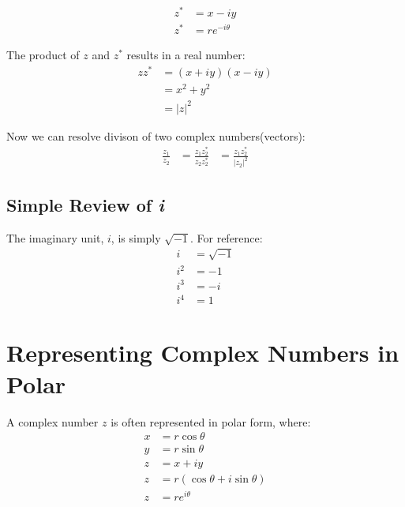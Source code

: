 \documentclass[12pt]{article}
\begin{document}
\begin{equation}
    \begin{aligned}
	    z^* &= x-iy\\
	    z^* &= re^{-i \theta}
    \end{aligned}
\end{equation}

The product of $z$ and $z^*$ results in a real number:
\begin{equation}
    \begin{aligned}
	    z z^* &= (x+iy)(x-iy)\\
		  &= x^2 + y^2\\
		  &= |z|^2  
    \end{aligned}
\end{equation}

Now we can resolve divison of two complex numbers(vectors):
\begin{equation}
    \begin{aligned}
	    \frac{z_1}{z_2} &=\frac{z_1 z_2^*}{z_2 z_2^*}
			    &=\frac{z_1 z_2^*}{|z_2|^2}
    \end{aligned}
\end{equation}

\subsection{Simple Review of \textit{i}}
The imaginary unit, $i$, is simply $\sqrt{-1}$. For reference:
\begin{equation}
    \begin{aligned}
	    i &= \sqrt{-1}\\
	    i^2 &= -1\\
	    i^3 &= -i\\
	    i^4 &= 1
    \end{aligned}
\end{equation}



\section{Representing Complex Numbers in Polar}
A complex number $z$ is often represented in polar form, where:
\begin{equation}
    \begin{aligned}
	    x &= r\cos{\theta}\\
	    y &= r\sin{\theta} \\
	    z &= x + iy \\
	    z &= r(\cos{\theta} + i\sin{\theta})\\
	    z &= re^{i\theta}
    \end{aligned}
\end{equation}
\end{document}
